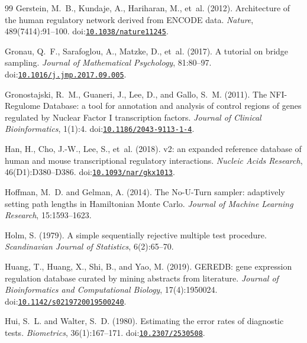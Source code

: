 \documentclass[11pt,a4paper]{article}
\begin{document}
\begin{thebibliography}{99}
Gerstein, M.~B., Kundaje, A., Hariharan, M., et~al. (2012).
\newblock Architecture of the human regulatory network derived from {ENCODE} data.
\newblock \emph{Nature}, 489(7414):91--100.
\newblock doi:\href{https://doi.org/10.1038/nature11245}{\nolinkurl{10.1038/nature11245}}.

Gronau, Q.~F., Sarafoglou, A., Matzke, D., et~al. (2017).
\newblock A tutorial on bridge sampling.
\newblock \emph{Journal of Mathematical Psychology}, 81:80--97.
\newblock doi:\href{https://doi.org/10.1016/j.jmp.2017.09.005}{\nolinkurl{10.1016/j.jmp.2017.09.005}}.

Gronostajski, R.~M., Guaneri, J., Lee, D., and Gallo, S.~M. (2011).
\newblock The NFI-Regulome Database: a tool for annotation and analysis of control regions of genes regulated by Nuclear Factor I transcription factors.
\newblock \emph{Journal of Clinical Bioinformatics}, 1(1):4.
\newblock doi:\href{https://doi.org/10.1186/2043-9113-1-4}{\nolinkurl{10.1186/2043-9113-1-4}}.

Han, H., Cho, J.-W., Lee, S., et~al. (2018).
 v2: an expanded reference database of human and mouse transcriptional regulatory interactions.
\newblock \emph{Nucleic Acids Research}, 46(D1):D380--D386.
\newblock doi:\href{https://doi.org/10.1093/nar/gkx1013}{\nolinkurl{10.1093/nar/gkx1013}}.

Hoffman, M.~D. and Gelman, A. (2014).
\newblock The No-U-Turn sampler: adaptively setting path lengths in {H}amiltonian {M}onte {C}arlo.
\newblock \emph{Journal of Machine Learning Research}, 15:1593--1623.

Holm, S. (1979).
\newblock A simple sequentially rejective multiple test procedure.
\newblock \emph{Scandinavian Journal of Statistics}, 6(2):65--70.

Huang, T., Huang, X., Shi, B., and Yao, M. (2019).
\newblock GEREDB: gene expression regulation database curated by mining abstracts from literature.
\newblock \emph{Journal of Bioinformatics and Computational Biology}, 17(4):1950024.
\newblock doi:\href{https://doi.org/10.1142/s0219720019500240}{\nolinkurl{10.1142/s0219720019500240}}.

Hui, S.~L. and Walter, S.~D. (1980).
\newblock Estimating the error rates of diagnostic tests.
\newblock \emph{Biometrics}, 36(1):167--171.
\newblock doi:\href{https://doi.org/10.2307/2530508}{\nolinkurl{10.2307/2530508}}.


\end{thebibliography}
\end{document}
